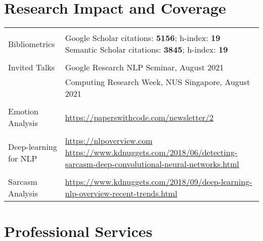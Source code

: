 \documentclass[a4paper,10pt]{article}
\begin{document}
\section{Research Impact and Coverage}
\vspace{0.1cm}

\begin{tabular}{R{2cm}| L{11cm}}

  \\
 Bibliometrics &  Google Scholar citations: \textbf{5156}; h-index: \textbf{19} \newline 
               Semantic Scholar citations: \textbf{3845}; h-index: \textbf{19} \\
  \\
 Invited Talks & Google Research NLP Seminar, August 2021 \\
 & Computing Research Week, NUS Singapore, August 2021 \\
  \\
 Emotion Analysis & \url{https://paperswithcode.com/newsletter/2} \\
  \\
 Deep-learning for NLP & \url{https://nlpoverview.com} \newline
 \url{https://www.kdnuggets.com/2018/06/detecting-sarcasm-deep-convolutional-neural-networks.html} \\ 
  \\
 Sarcasm Analysis & \url{https://www.kdnuggets.com/2018/09/deep-learning-nlp-overview-recent-trends.html} \\
\end{tabular}









\section{Professional Services}
\vspace{0.1cm}
\end{document}
